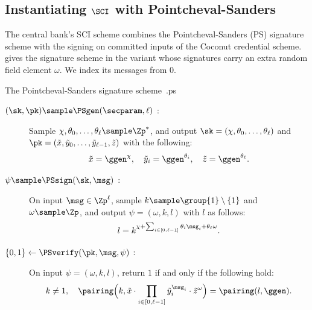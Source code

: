 \subsection{Instantiating $\SCI$ with Pointcheval-Sanders}\label{sec:offline-token-issuance}

The central bank's SCI scheme combines the Pointcheval-Sanders (PS) signature scheme with the signing on committed inputs of the
Coconut credential scheme.  gives the signature scheme in the
variant whose signatures carry an extra random field element $\omega$. We index
its messages from $0$.

\begin{primitivebox}{The Pointcheval-Sanders signature scheme~\cite{RSA:PoiSan16,RSA:PoiSan18}.}{ps}

  \begin{description}

    \item[$(\sk, \pk) \sample \PSgen(\secparam, \ell)$ :] Sample $\chi,
\theta_0, \ldots, \theta_\ell \sample \Zp^*$, and output $\sk = (\chi,
\theta_0, \ldots, \theta_\ell)$ and $\pk = (\tilde{x}, \tilde{y}_0, \ldots,
\tilde{y}_{\ell-1}, \tilde{z})$ with the following:
          \begin{equation*}
            \tilde{x} = \ggen^{\chi}, \quad \tilde{y}_i = \ggen^{\theta_i}, \quad
\tilde{z} = \ggen^{\theta_\ell}.
          \end{equation*}

    \item[$\psi \sample \PSsign(\sk, \msg)$ :] On input $\msg \in
\Zp^{\ell}$, sample $k \sample \group{1} \setminus \{1\}$ and $\omega \sample
\Zp$, and output $\psi = (\omega, k, l)$ with $l$ as follows:
          \begin{equation*}
            l = k^{\chi + \sum_{i \in [0, \ell-1]} \theta_i \msg_i + \theta_\ell
\omega}.
          \end{equation*}

    \item[$\{0,1\} \leftarrow \PSverify(\pk, \msg, \psi)$ :] On input $\psi =
(\omega, k, l)$, return $1$ if and only if the following hold:
          \begin{equation*}
            k \neq 1, \quad \pairing\Big(k, \tilde{x} \cdot \prod_{i \in [0, \ell-1]}
\tilde{y}_i^{\msg_i} \cdot \tilde{z}^{\omega}\Big) = \pairing(l, \ggen).
          \end{equation*}

  \end{description}

\end{primitivebox}

